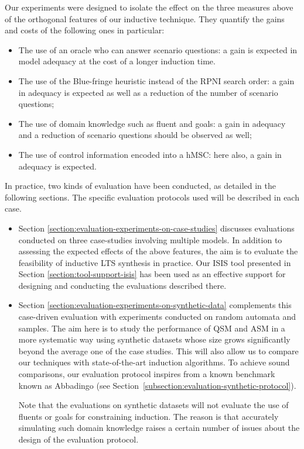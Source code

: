 Our experiments were designed to isolate the effect on the three measures above of the orthogonal features of our inductive technique. They quantify the gains and costs of the following ones in particular:
\begin{itemize}
\item The use of an oracle who can answer scenario questions: a gain is expected in model adequacy at the cost of a longer induction time.
\item The use of the Blue-fringe heuristic instead of the RPNI search order: a gain in adequacy is expected as well as a reduction of the number of scenario questions;
\item The use of domain knowledge such as fluent and goals: a gain in adequacy and a reduction of scenario questions should be observed as well;
\item The use of control information encoded into a hMSC: here also, a gain in adequacy is expected.
\end{itemize}

In practice, two kinds of evaluation have been conducted, as detailed in the following sections. The specific evaluation protocols used will be described in each case.
\begin{itemize}

\item Section \ref{section:evaluation-experiments-on-case-studies} discusses evaluations conducted on three case-studies involving multiple models. In addition to assessing the expected effects of the above features, the aim is to evaluate the feasibility of inductive LTS synthesis in practice. Our ISIS tool presented in Section \ref{section:tool-support-isis} has been used as an effective support for designing and conducting the evaluations described there.

\item Section \ref{section:evaluation-experiments-on-synthetic-data} complements this case-driven evaluation with experiments conducted on random automata and samples. The aim here is to study the performance of QSM and ASM in a more systematic way using synthetic datasets whose size grows significantly beyond the average one of the case studies. This will also allow us to compare our techniques with state-of-the-art induction algorithms. To achieve sound comparisons, our evaluation protocol inspires from a known benchmark known as Abbadingo \cite{Lang:1998} (see Section~\ref{subsection:evaluation-synthetic-protocol}).

Note that the evaluations on synthetic datasets will not evaluate the use of fluents or goals for constraining induction. The reason is that accurately simulating such domain knowledge raises a certain number of issues about the design of the evaluation protocol.

\end{itemize}
